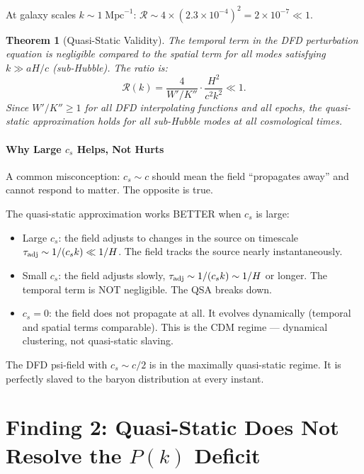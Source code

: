 \documentclass[11pt]{article}
\newtheorem{theorem}{Theorem}
\newcommand{\ee}[1]{\times 10^{#1}}
\begin{document}
At galaxy scales $k \sim 1\;\text{Mpc}^{-1}$:
$\mathcal{R} \sim 4 \times (2.3\ee{-4})^2 = 2\ee{-7} \ll 1$.

\begin{theorem}[Quasi-Static Validity]
\label{thm:QS}
The temporal term in the DFD perturbation equation is negligible
compared to the spatial term for all modes satisfying $k \gg aH/c$
(sub-Hubble). The ratio is:
\begin{equation}
\mathcal{R}(k) = \frac{4}{W'/K''} \cdot \frac{H^2}{c^2 k^2} \ll 1.
\end{equation}
Since $W'/K'' \geq 1$ for all DFD interpolating functions and all
epochs, the quasi-static approximation holds for all sub-Hubble modes
at all cosmological times.
\end{theorem}

\subsection{Why Large $c_s$ Helps, Not Hurts}

A common misconception: $c_s \sim c$ should mean the field ``propagates
away'' and cannot respond to matter. The opposite is true.

The quasi-static approximation works BETTER when $c_s$ is large:
\begin{itemize}[nosep]
\item Large $c_s$: the field adjusts to changes in the source on
  timescale $\tau_{\rm adj} \sim 1/(c_s k) \ll 1/H$. The field
  tracks the source nearly instantaneously.
\item Small $c_s$: the field adjusts slowly, $\tau_{\rm adj} \sim
  1/(c_s k) \sim 1/H$ or longer. The temporal term is NOT negligible.
  The QSA breaks down.
\item $c_s = 0$: the field does not propagate at all. It evolves
  dynamically (temporal and spatial terms comparable). This is the
  CDM regime --- dynamical clustering, not quasi-static slaving.
\end{itemize}

The DFD psi-field with $c_s \sim c/2$ is in the maximally quasi-static
regime. It is perfectly slaved to the baryon distribution at every
instant.


\part{Finding 2: Quasi-Static Does Not Resolve the $P(k)$ Deficit}
\label{part:Pk-deficit}
\end{document}
